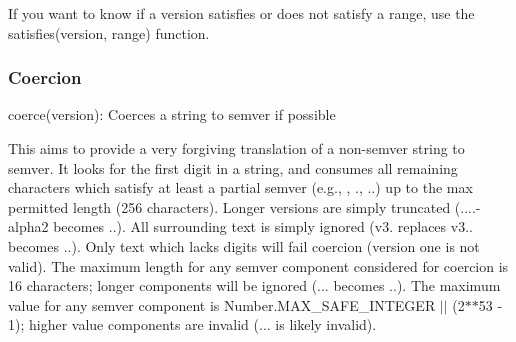 If you want to know if a version satisfies or does not satisfy a range, use the {\ttfamily satisfies(version, range)} function.

\subsubsection*{Coercion}


\begin{DoxyItemize}
\item {\ttfamily coerce(version)}\+: Coerces a string to semver if possible
\end{DoxyItemize}

This aims to provide a very forgiving translation of a non-\/semver string to semver. It looks for the first digit in a string, and consumes all remaining characters which satisfy at least a partial semver (e.\+g., {}, {.}, {..}) up to the max permitted length (256 characters). Longer versions are simply truncated ({....-\/alpha2} becomes {..}). All surrounding text is simply ignored ({\ttfamily v3. replaces v3..} becomes {..}). Only text which lacks digits will fail coercion ({\ttfamily version one} is not valid). The maximum length for any semver component considered for coercion is 16 characters; longer components will be ignored ({...} becomes {..}). The maximum value for any semver component is {\ttfamily Number.\+M\+A\+X\+\_\+\+S\+A\+F\+E\+\_\+\+I\+N\+T\+E\+G\+ER $\vert$$\vert$ (2$\ast$$\ast$53 -\/ 1)}; higher value components are invalid ({...} is likely invalid). 